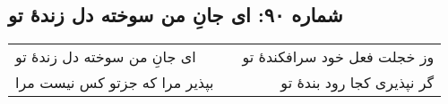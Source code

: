 \begin{center}
\section*{شماره ۹۰: ای جانِ من سوخته دل زندۀ تو}
\label{sec:090}
\begin{longtable}{l p{0.5cm} r}
ای جانِ من سوخته دل زندهٔ تو
&&
وز خجلت فعل خود سرافکندهٔ تو
\\
بپذیر مرا که جزتو کس نیست مرا
&&
گر نپذیری کجا رود بندهٔ تو
\\
\end{longtable}
\end{center}

